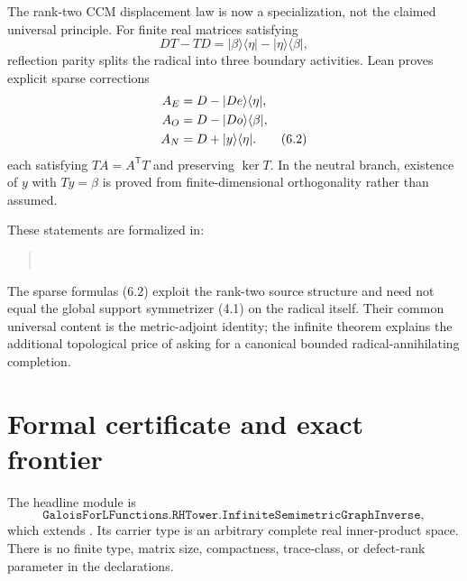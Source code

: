 \documentclass[11pt]{article}
\theoremstyle{definition}
\theoremstyle{remark}
\newcommand{\kerop}{\operatorname{ker}}
\begin{document}
The rank-two CCM displacement law is now a specialization, not the claimed universal principle.
For finite real matrices satisfying
\[
 DT-TD=|\beta\rangle\langle\eta|-|\eta\rangle\langle\beta|, \tag{6.1}
\]
reflection parity splits the radical into three boundary activities.  Lean proves explicit sparse
corrections
\begin{align}
 A_E&=D-|De\rangle\langle\eta|,\notag\\
 A_O&=D-|Do\rangle\langle\beta|,\notag\\
 A_N&=D+|y\rangle\langle\eta|. \tag{6.2}
\end{align}
each satisfying $TA=A^{\mathsf T}T$ and preserving $\kerop T$.  In the neutral branch, existence
of $y$ with $Ty=\beta$ is proved from finite-dimensional orthogonality rather than assumed.

These statements are formalized in:
\begin{quote}\footnotesize
{}\\
\end{quote}

The sparse formulas (6.2) exploit the rank-two source structure and need not equal the global
support symmetrizer (4.1) on the radical itself.  Their common universal content is the
metric-adjoint identity; the infinite theorem explains the additional topological price of asking
for a canonical bounded radical-annihilating completion.

\section{Formal certificate and exact frontier}

The headline module is
\[
\texttt{GaloisForLFunctions.RHTower.InfiniteSemimetricGraphInverse},
\]
which extends
.
Its carrier type is an arbitrary complete real inner-product space.  There is no finite type,
matrix size, compactness, trace-class, or defect-rank parameter in the declarations.
\end{document}
